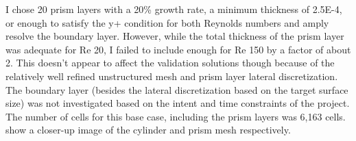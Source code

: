 \documentclass[10pt,english]{article}
\begin{document}
I chose 20 prism layers with a 20\% growth rate, a minimum thickness of 2.5E-4, or enough to satisfy the y+ condition for both Reynolds numbers and amply resolve the boundary layer.  However, while the total thickness of the prism layer was adequate for Re 20, I failed to include enough for Re 150 by a factor of about 2.  This doesn't appear to affect the validation solutions though because of the relatively well refined unstructured mesh and prism layer lateral discretization.  The boundary layer (besides the lateral discretization based on the target surface size) was not investigated based on the intent and time constraints of the project.  The number of cells for this base case, including the prism layers was 6,163 cells.  show a closer-up image of the cylinder and prism mesh respectively.  
\end{document}
